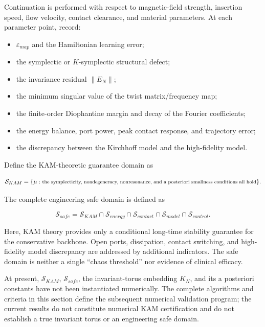 Continuation is performed with respect to magnetic-field strength, insertion speed, flow velocity, contact clearance, and material parameters. At each parameter point, record:

\begin{itemize}
\tightlist
\item
  \(\varepsilon_{map}\) and the Hamiltonian learning error;
\item
  the symplectic or \(K\)-symplectic structural defect;
\item
  the invariance residual \(\parallel E_{N} \parallel\);
\item
  the minimum singular value of the twist matrix/frequency map;
\item
  the finite-order Diophantine margin and decay of the Fourier coefficients;
\item
  the energy balance, port power, peak contact response, and trajectory error;
\item
  the discrepancy between the Kirchhoff model and the high-fidelity model.
\end{itemize}

Define the KAM-theoretic guarantee domain as

\begin{equation}
\label{eq:symplectic-kam-5-20}
\mathcal{S}_{KAM} = \{\mu:\text{\footnotesize the symplecticity, nondegeneracy, nonresonance, and a posteriori smallness conditions all hold}\}.
\end{equation}

The complete engineering safe domain is defined as

\begin{equation}
\label{eq:symplectic-kam-5-21}
\boxed{\mathcal{S}_{safe} = \mathcal{S}_{KAM} \cap \mathcal{S}_{energy} \cap \mathcal{S}_{contact} \cap \mathcal{S}_{model} \cap \mathcal{S}_{control}.}
\end{equation}

Here, KAM theory provides only a conditional long-time stability guarantee for the conservative backbone. Open ports, dissipation, contact switching, and high-fidelity model discrepancy are addressed by additional indicators. The safe domain is neither a single ``chaos threshold'' nor evidence of clinical efficacy.

At present, \(\mathcal{S}_{KAM}\), \(\mathcal{S}_{safe}\), the invariant-torus embedding \(K_N\), and its a posteriori constants have not been instantiated numerically. The complete algorithms and criteria in this section define the subsequent numerical validation program; the current results do not constitute numerical KAM certification and do not establish a true invariant torus or an engineering safe domain.
